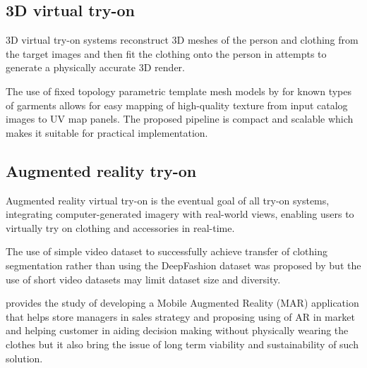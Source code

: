 
	\subsection{\textbf{3D virtual try-on}}
		3D virtual try-on systems reconstruct 3D meshes of the person and clothing from the target images and then fit the clothing onto the person in attempts to generate a physically accurate 3D render.


        The use of fixed topology parametric template mesh models by \cite{DBLP:conf/nips/SantestebanOTC22} for known types of garments allows for easy mapping of high-quality texture from input catalog images to UV map panels. The proposed pipeline is compact and scalable which makes it suitable for practical implementation.

	\subsection{\textbf{Augmented reality try-on}}
		Augmented reality virtual try-on is the eventual goal of all try-on systems, integrating computer-generated imagery with real-world views, enabling users to virtually try on clothing and accessories in real-time.
		
        The use of simple video dataset to successfully achieve transfer of clothing segmentation rather than using the DeepFashion dataset was proposed by  {
            but the use of short video datasets may limit dataset size and diversity.
        }

		\cite{DBLP:journals/ijim/El-SeoudT19} provides the study of developing a Mobile Augmented Reality (MAR) application that helps store managers in sales strategy and proposing using of AR in market and helping customer in aiding decision making without physically wearing the clothes but it also bring the issue of long term viability and sustainability of such solution.

